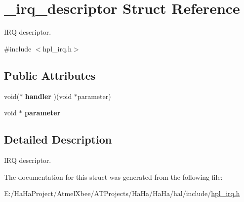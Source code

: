 \hypertarget{struct__irq__descriptor}{}\section{\+\_\+irq\+\_\+descriptor Struct Reference}
\label{struct__irq__descriptor}


I\+RQ descriptor.  




{\ttfamily \#include $<$hpl\+\_\+irq.\+h$>$}

\subsection*{Public Attributes}
\begin{DoxyCompactItemize}
\item 
\mbox{\label{struct__irq__descriptor_a5c5645efb32460ff3105eff8e6206b91}} 
void($\ast$ {\bfseries handler} )(void $\ast$parameter)
\item 
\mbox{\label{struct__irq__descriptor_a9c58c3f373aebb6b725b9b47def981fd}} 
void $\ast$ {\bfseries parameter}
\end{DoxyCompactItemize}


\subsection{Detailed Description}
I\+RQ descriptor. 

The documentation for this struct was generated from the following file\+:\begin{DoxyCompactItemize}
\item 
E\+:/\+Ha\+Ha\+Project/\+Atmel\+Xbee/\+A\+T\+Projects/\+Ha\+Ha/\+Ha\+Ha/hal/include/\hyperlink{hpl__irq_8h}{hpl\+\_\+irq.\+h}\end{DoxyCompactItemize}
